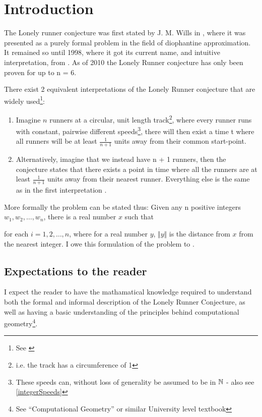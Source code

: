 \section{Introduction}
\label{introduction}
The Lonely runner conjecture was first stated by J. M. Wills in \cite{JMWills}, where it was presented as a purely formal problem in the field of diophantine approximation. It remained so until 1998, where it got its current name, and intuitive interpretation, from \cite{Bienia97flows.view-obstructions}. As of 2010 the Lonely Runner conjecture has only been proven for up to n = 6.

There exist 2 equivalent interpretations of the Lonely Runner conjecture that are widely used\footnote{See \cite{ANote}}:
\begin{enumerate}
\item Imagine $n$ runners at a circular, unit length track\footnote{i.e. the track has a circumference of 1}, where every runner runs with constant, pairwise different speeds\footnote{These speeds can, without loss of generality be assumed to be in $\mathbb{N}$ \cite{Bienia97flows.view-obstructions} - also see \ref{integerSpeeds}}, there will then exist a time t where all runners will be at least $\frac{1}{n + 1}$ units away from their common start-point.\\

\item Alternatively, imagine that we instead have n + 1 runners, then the conjecture states that there exists a point in time where all the runners are at least $\frac{1}{n + 1}$ units away from their nearest runner. Everything else is the same as in the first interpretation \cite{Bienia97flows.view-obstructions}.\\
\end{enumerate}

More formally the problem can be stated thus: 
Given any n positive integers $w_1, w_2, \ldots, w_n$, there is a real number $x$ such that 

for each $i = 1, 2, \ldots, n$, where for a real number $y$, $\Vert y \Vert$ is the distance from $x$ from the nearest integer. I owe this formulation of the problem to \cite{ANote}.

\subsection{Expectations to the reader}
I expect the reader to have the mathamatical knowledge required to understand both the formal and informal description of the Lonely Runner Conjecture, as well as having a basic understanding of the principles behind computational geometry\footnote{See ``Computational Geometry'' \cite{citeulike:3347056} or similar University level textbook}.

